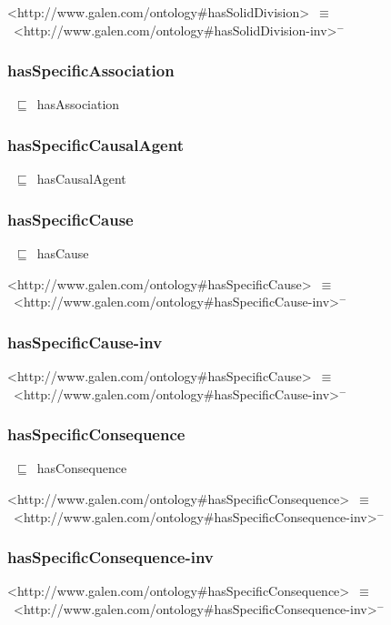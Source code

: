 \documentclass{article}
\begin{document}
<http://www.galen.com/ontology#hasSolidDivision>~\ensuremath{\equiv}~<http://www.galen.com/ontology#hasSolidDivision-inv>\ensuremath{^-}

\subsubsection*{hasSpecificAssociation}

~\ensuremath{\sqsubseteq}~hasAssociation

\subsubsection*{hasSpecificCausalAgent}

~\ensuremath{\sqsubseteq}~hasCausalAgent

\subsubsection*{hasSpecificCause}

~\ensuremath{\sqsubseteq}~hasCause

<http://www.galen.com/ontology#hasSpecificCause>~\ensuremath{\equiv}~<http://www.galen.com/ontology#hasSpecificCause-inv>\ensuremath{^-}

\subsubsection*{hasSpecificCause-inv}

<http://www.galen.com/ontology#hasSpecificCause>~\ensuremath{\equiv}~<http://www.galen.com/ontology#hasSpecificCause-inv>\ensuremath{^-}

\subsubsection*{hasSpecificConsequence}

~\ensuremath{\sqsubseteq}~hasConsequence

<http://www.galen.com/ontology#hasSpecificConsequence>~\ensuremath{\equiv}~<http://www.galen.com/ontology#hasSpecificConsequence-inv>\ensuremath{^-}

\subsubsection*{hasSpecificConsequence-inv}

<http://www.galen.com/ontology#hasSpecificConsequence>~\ensuremath{\equiv}~<http://www.galen.com/ontology#hasSpecificConsequence-inv>\ensuremath{^-}
\end{document}
